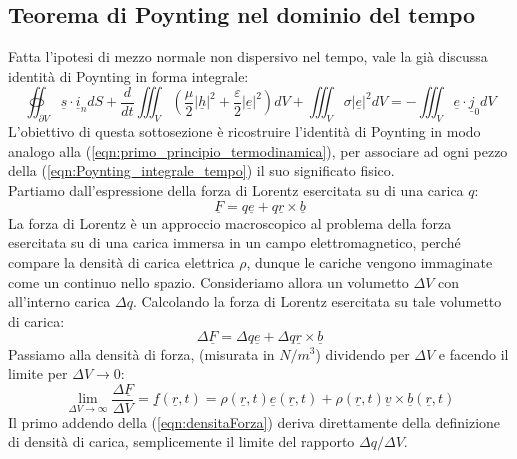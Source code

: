 \documentclass{book}
\begin{document}
    \subsection{Teorema di Poynting nel dominio del tempo}
        Fatta l'ipotesi di mezzo normale non dispersivo nel tempo, vale la già discussa identità di Poynting in forma integrale:
        \begin{equation}
            \label{eqn:Poynting_integrale_tempo}
            \oiint_{\partial V} \underline{s} \cdot \underline{i}_{n}dS+\frac{d}{dt}\iiint_{V}(\frac{\mu}{2}|\underline{h}|^{2}+\frac{\varepsilon}{2}|\underline{e}|^{2})dV +
            \iiint_{V}\sigma |\underline{e}|^{2}dV = - \iiint_{V} \underline{e}\cdot \underline{j}_{0}dV
        \end{equation}
        L'obiettivo di questa sottosezione è ricostruire l'identità di Poynting in modo analogo alla (\ref{eqn:primo_principio_termodinamica}), per associare ad ogni pezzo della
        (\ref{eqn:Poynting_integrale_tempo}) il suo significato fisico. \\
        Partiamo dall'espressione della forza di Lorentz esercitata su di una carica $q$:
        \begin{equation}
            \underline{F}= q \underline{e}+q \underline{r} \times \underline{b}
        \end{equation}
        La forza di Lorentz è un approccio macroscopico al problema della forza esercitata su di una carica immersa in un campo elettromagnetico, perché compare la densità di carica
        elettrica $\rho$, dunque le cariche vengono immaginate come un continuo nello spazio. Consideriamo allora un volumetto $\Delta V$ con all'interno carica $\Delta q$.
        Calcolando la forza di Lorentz esercitata su tale volumetto di carica:
        \begin{equation}
            \Delta \underline{F} = \Delta q\underline{e}+\Delta q \underline{r}\times \underline{b}
        \end{equation}
        Passiamo alla densità di forza, (misurata in $N/m^{3}$) dividendo per $\Delta V$ e facendo il limite per $\Delta V \to 0$:
        \begin{equation}
            \label{eqn:densitaForza}
            \lim_{\Delta V \to \infty} \frac{\Delta \underline{F}}{\Delta V} = \underline{f}(\underline{r},t) = \rho(\underline{r},t)\underline{e}(\underline{r},t)+\rho(\underline{r},t)\underline{v}\times \underline{b}(\underline{r},t)
        \end{equation}
        Il primo addendo della (\ref{eqn:densitaForza}) deriva direttamente della definizione di densità di carica, semplicemente il limite del rapporto $\Delta q/\Delta V$.
\end{document}
